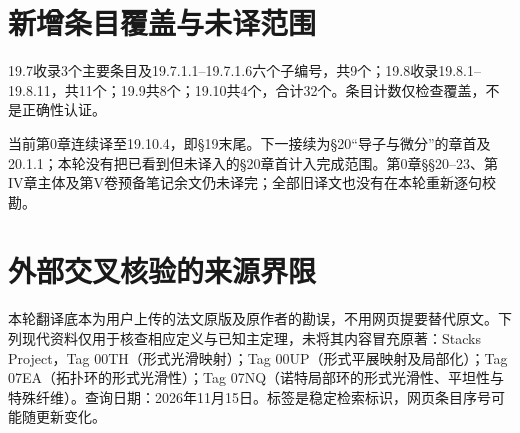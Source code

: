 \section*{新增条目覆盖与未译范围}
19.7收录3个主要条目及19.7.1.1--19.7.1.6六个子编号，共9个；19.8收录19.8.1--19.8.11，共11个；19.9共8个；19.10共4个，合计32个。条目计数仅检查覆盖，不是正确性认证。

当前第0章连续译至19.10.4，即§19末尾。下一接续为§20“导子与微分”的章首及20.1.1；本轮没有把已看到但未译入的§20章首计入完成范围。第0章§§20--23、第IV章主体及第V卷预备笔记余文仍未译完；全部旧译文也没有在本轮重新逐句校勘。

\section*{外部交叉核验的来源界限}
本轮翻译底本为用户上传的法文原版及原作者的勘误，不用网页提要替代原文。下列现代资料仅用于核查相应定义与已知主定理，未将其内容冒充原著：Stacks Project，Tag 00TH（形式光滑映射）；Tag 00UP（形式平展映射及局部化）；Tag 07EA（拓扑环的形式光滑性）；Tag 07NQ（诺特局部环的形式光滑性、平坦性与特殊纤维）。查询日期：2026年11月15日。标签是稳定检索标识，网页条目序号可能随更新变化。
